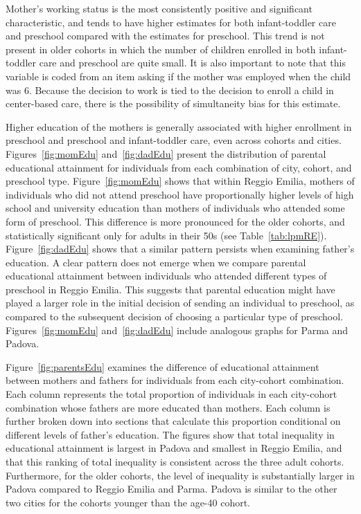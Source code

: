 Mother's working status is the most consistently positive and significant characteristic, and tends to have higher estimates for both infant-toddler care and preschool compared with the estimates for preschool. This trend is not present in older cohorts in which the number of children enrolled in both infant-toddler care and preschool are quite small. It is also important to note that this variable is coded from an item asking if the mother was employed when the child was 6. Because the decision to work is tied to the decision to enroll a child in center-based care, there is the possibility of simultaneity bias for this estimate. 

Higher education of the mothers is generally associated with higher enrollment in preschool and preschool and infant-toddler care, even across cohorts and cities. Figures~\ref{fig:momEdu} and~\ref{fig:dadEdu} present the distribution of parental educational attainment for individuals from each combination of city, cohort, and preschool type. Figure~\ref{fig:momEdu} shows that within Reggio Emilia, mothers of individuals who did not attend preschool have proportionally higher levels of high school and university education than mothers of individuals who attended some form of preschool. This difference is more pronounced for the older cohorts, and statistically significant only for adults in their 50s (see Table~\ref{tab:lpmRE}). Figure~\ref{fig:dadEdu} shows that a similar pattern persists when examining father's education. A clear pattern does not emerge when we compare parental educational attainment between individuals who attended different types of preschool in Reggio Emilia. This suggests that parental education might have played a larger role in the initial decision of sending an individual to preschool, as compared to the subsequent decision of choosing a particular type of preschool. Figures~\ref{fig:momEdu} and~\ref{fig:dadEdu} include analogous graphs for Parma and Padova.

Figure~\ref{fig:parentsEdu} examines the difference of educational attainment between mothers and fathers for individuals from each city-cohort combination. Each column represents the total proportion of individuals in each city-cohort combination whose fathers are more educated than mothers. Each column is further broken down into sections that calculate this proportion conditional on different levels of father's education. The figures show that total inequality in educational attainment is largest in Padova and smallest in Reggio Emilia, and that this ranking of total inequality is consistent across the three adult cohorts. Furthermore, for the older cohorts, the level of inequality is substantially larger in Padova compared to Reggio Emilia and Parma. Padova is similar to the other two cities for the cohorts younger than the age-40 cohort. 


